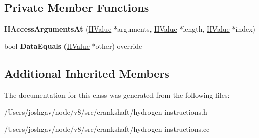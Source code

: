 \subsection*{Private Member Functions}
\begin{DoxyCompactItemize}
\item 
{\bfseries H\+Access\+Arguments\+At} (\hyperlink{classv8_1_1internal_1_1_h_value}{H\+Value} $\ast$arguments, \hyperlink{classv8_1_1internal_1_1_h_value}{H\+Value} $\ast$length, \hyperlink{classv8_1_1internal_1_1_h_value}{H\+Value} $\ast$index)\hypertarget{classv8_1_1internal_1_1_h_access_arguments_at_ac8fdfc0c09cb13274bffced488f2bf0f}{}\label{classv8_1_1internal_1_1_h_access_arguments_at_ac8fdfc0c09cb13274bffced488f2bf0f}

\item 
bool {\bfseries Data\+Equals} (\hyperlink{classv8_1_1internal_1_1_h_value}{H\+Value} $\ast$other) override\hypertarget{classv8_1_1internal_1_1_h_access_arguments_at_a372f7b3b5cfcf34046dd0905a2f5c7da}{}\label{classv8_1_1internal_1_1_h_access_arguments_at_a372f7b3b5cfcf34046dd0905a2f5c7da}

\end{DoxyCompactItemize}
\subsection*{Additional Inherited Members}


The documentation for this class was generated from the following files\+:\begin{DoxyCompactItemize}
\item 
/\+Users/joshgav/node/v8/src/crankshaft/hydrogen-\/instructions.\+h\item 
/\+Users/joshgav/node/v8/src/crankshaft/hydrogen-\/instructions.\+cc\end{DoxyCompactItemize}

